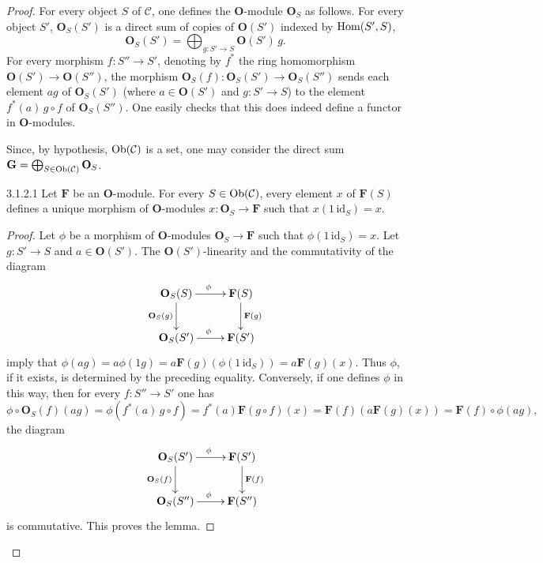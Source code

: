 \begin{proof}
For every object \(S\) of \(\mathcal{C}\), one defines the
\(\mathbf{O}\)-module \(\mathbf{O}_S\) as follows.
For every object \(S'\), \(\mathbf{O}_S(S')\) is a direct sum of copies of
\(\mathbf{O}(S')\) indexed by \(\operatorname{Hom}(S',S)\), \ie
\[
\mathbf{O}_S(S')=\bigoplus_{g\colon S'\to S}\mathbf{O}(S')\,g.
\]
For every morphism \(f\colon S''\to S'\), denoting by \(f^{*}\) the ring
homomorphism \(\mathbf{O}(S')\to\mathbf{O}(S'')\), the morphism
\(\mathbf{O}_S(f)\colon\mathbf{O}_S(S')\to\mathbf{O}_S(S'')\) sends each
element \(ag\) of \(\mathbf{O}_S(S')\) (where \(a\in\mathbf{O}(S')\) and
\(g\colon S'\to S\)) to the element \(f^{*}(a)\,g\circ f\) of
\(\mathbf{O}_S(S'')\). One easily checks that this does indeed define a
functor in \(\mathbf{O}\)-modules.

Since, by hypothesis, \(\operatorname{Ob}(\mathcal{C})\) is a set, one may consider the
direct sum \(\mathbf{G}=\bigoplus_{S\in\operatorname{Ob}(\mathcal{C})}\mathbf{O}_S\).

\begin{lemma}{3.1.2.1}\label{I.3.1.2.1}
Let \(\mathbf{F}\) be an \(\mathbf{O}\)-module. For every
\(S\in\operatorname{Ob}(\mathcal{C})\), every element \(x\) of \(\mathbf{F}(S)\) defines a
unique morphism of \(\mathbf{O}\)-modules \(x\colon\mathbf{O}_S\to\mathbf{F}\)
such that \(x(1\,\mathrm{id}_S)=x\).
\end{lemma}

\begin{proof}
Let \(\phi\) be a morphism of \(\mathbf{O}\)-modules
\(\mathbf{O}_S\to\mathbf{F}\) such that \(\phi(1\,\mathrm{id}_S)=x\).
Let \(g\colon S'\to S\) and \(a\in\mathbf{O}(S')\).
The \(\mathbf{O}(S')\)-linearity and the commutativity of the diagram
\[
\xymatrix{
\mathbf{O}_S(S) \ar[r]^{\phi} \ar[d]_{\mathbf{O}_S(g)}
  & \mathbf{F}(S) \ar[d]^{\mathbf{F}(g)} \\
\mathbf{O}_S(S') \ar[r]^{\phi}
  & \mathbf{F}(S')
}
\]
imply that
\(\phi(ag)=a\phi(1g)=a\mathbf{F}(g)(\phi(1\,\mathrm{id}_S))=a\mathbf{F}(g)(x)\).
Thus \(\phi\), if it exists, is determined by the preceding equality.
Conversely, if one defines \(\phi\) in this way, then for every
\(f\colon S''\to S'\) one has
\[
\phi\circ\mathbf{O}_S(f)(ag)
=\phi(f^{*}(a)\,g\circ f)
=f^{*}(a)\mathbf{F}(g\circ f)(x)
=\mathbf{F}(f)(a\mathbf{F}(g)(x))
=\mathbf{F}(f)\circ\phi(ag),
\]
\ie the diagram
\[
\xymatrix{
\mathbf{O}_S(S') \ar[r]^{\phi} \ar[d]_{\mathbf{O}_S(f)}
  & \mathbf{F}(S') \ar[d]^{\mathbf{F}(f)} \\
\mathbf{O}_S(S'') \ar[r]^{\phi}
  & \mathbf{F}(S'')
}
\]
is commutative. This proves the lemma.
\end{proof}


\end{proof}
